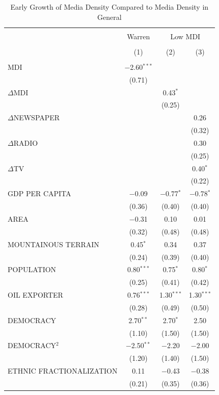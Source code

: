 \documentclass[11pt,article,oneside]{memoir}
\begin{document}
\begin{table}[!htbp] \centering 
  \caption{Early Growth of Media Density Compared to Media Density in General} 
  \label{} 
\footnotesize 
\begin{tabular}{@{\extracolsep{5pt}}lccc} 
\\[-1.8ex]\hline \\[-1.8ex] 
 & Warren & \multicolumn{2}{c}{Low MDI} \\ 
\\[-1.8ex] & (1) & (2) & (3)\\ 
\hline \\[-1.8ex] 
 MDI & $-$2.60$^{***}$ &  &  \\ 
  & (0.71) &  &  \\ 
  $\Delta$MDI &  & 0.43$^{*}$ &  \\ 
  &  & (0.25) &  \\ 
  $\Delta$NEWSPAPER &  &  & 0.26 \\ 
  &  &  & (0.32) \\ 
  $\Delta$RADIO &  &  & 0.30 \\ 
  &  &  & (0.25) \\ 
  $\Delta$TV &  &  & 0.40$^{*}$ \\ 
  &  &  & (0.22) \\ 
  GDP PER CAPITA & $-$0.09 & $-$0.77$^{*}$ & $-$0.78$^{*}$ \\ 
  & (0.36) & (0.40) & (0.40) \\ 
  AREA & $-$0.31 & 0.10 & 0.01 \\ 
  & (0.32) & (0.48) & (0.48) \\ 
  MOUNTAINOUS TERRAIN & 0.45$^{*}$ & 0.34 & 0.37 \\ 
  & (0.24) & (0.39) & (0.40) \\ 
  POPULATION & 0.80$^{***}$ & 0.75$^{*}$ & 0.80$^{*}$ \\ 
  & (0.25) & (0.41) & (0.42) \\ 
  OIL EXPORTER & 0.76$^{***}$ & 1.30$^{***}$ & 1.30$^{***}$ \\ 
  & (0.28) & (0.49) & (0.50) \\ 
  DEMOCRACY & 2.70$^{**}$ & 2.70$^{*}$ & 2.50 \\ 
  & (1.10) & (1.50) & (1.50) \\ 
  DEMOCRACY$^2$ & $-$2.50$^{**}$ & $-$2.20 & $-$2.00 \\ 
  & (1.20) & (1.40) & (1.50) \\ 
  ETHNIC FRACTIONALIZATION & 0.11 & $-$0.43 & $-$0.38 \\ 
  & (0.21) & (0.35) & (0.36) \\ 

\end{tabular}
\end{table}
\end{document}

